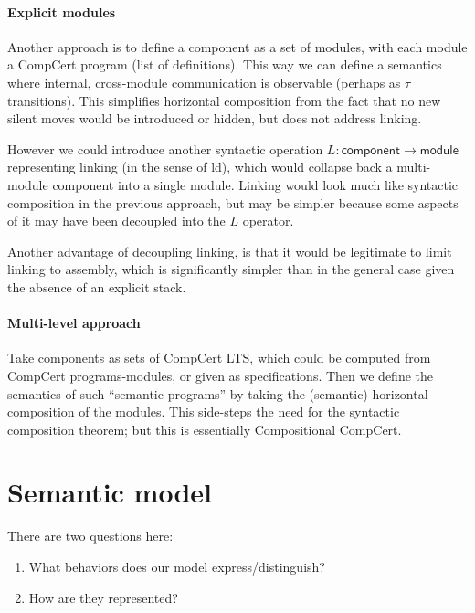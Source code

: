\documentclass[11pt]{article}
\begin{document}

\paragraph{Explicit modules} %

Another approach is to define a component as a set of modules,
with each module a CompCert program (list of definitions).
This way we can define a semantics where
internal, cross-module communication is observable
(perhaps as $\tau$ transitions).
This simplifies horizontal composition
from the fact that no new silent moves
would be introduced or hidden,
but does not address linking.

However we could introduce another syntactic operation
$L : \mathsf{component} \rightarrow \mathsf{module}$
representing linking (in the sense of \textsf{ld}),
which would collapse back a multi-module component
into a single module.
Linking would look much like syntactic composition in the previous approach,
but may be simpler because
some aspects of it may have been decoupled into
the $L$ operator.

Another advantage of decoupling linking,
is that it would be legitimate
to limit linking to assembly,
which is significantly simpler
than in the general case
given the absence of an explicit stack.


\paragraph{Multi-level approach} %

Take components as sets of CompCert LTS,
which could be computed from CompCert programs-modules,
or given as specifications.
Then we define the semantics of such
``semantic programs'' by taking the (semantic)
horizontal composition of the modules.
This side-steps the need for the syntactic composition theorem;
but this is essentially Compositional CompCert.



\section{Semantic model} %

There are two questions here:
\begin{enumerate}
\item What behaviors does our model express/distinguish?
\item How are they represented?
\end{enumerate}
\end{document}
